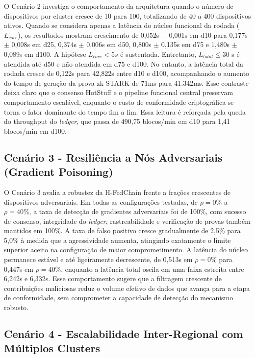 \documentclass[12pt]{article}
\begin{document}
O Cenário 2 investiga o comportamento da arquitetura quando o número de dispositivos por cluster cresce de 10 para 100, totalizando de 40 a 400 dispositivos ativos. Quando se considera apenas a latência do núcleo funcional da rodada ($L_{core}$), os resultados mostram crescimento de 0,052s $\pm$ 0,001s em d10 para 0,177s $\pm$ 0,008s em d25, 0,374s $\pm$ 0,006s em d50, 0,800s $\pm$ 0,135s em d75 e 1,480s $\pm$ 0,089s em d100. A hipótese $L_{core} < 5s$ é sustentada. Entretanto, $L_{total} ≤ 30$ s é atendida até d50 e não atendida em d75 e d100. No entanto, a latência total da rodada cresce de 0,122s para 42,822s entre d10 e d100, acompanhando o aumento do tempo de geração da prova zk-STARK de 71ms para 41.342ms. Esse contraste deixa claro que o consenso HotStuff e o pipeline funcional central preservam comportamento escalável, enquanto o custo de conformidade criptográfica se torna o fator dominante do tempo fim a fim. Essa leitura é reforçada pela queda do throughput do \textit{ledger}, que passa de 490,75 blocos/min em d10 para 1,41 blocos/min em d100.

\subsection{Cenário 3 - Resiliência a Nós Adversariais (Gradient Poisoning)}

O Cenário 3 avalia a robustez da H-FedChain frente a frações crescentes de dispositivos adversariais. Em todas as configurações testadas, de $\rho=0\%$ a $\rho=40\%$, a taxa de detecção de gradientes adversariais foi de 100\%, com sucesso de consenso, integridade do \textit{ledger}, rastreabilidade e verificação de provas também mantidos em 100\%. A taxa de falso positivo cresce gradualmente de 2,5\% para 5,0\% à medida que a agressividade aumenta, atingindo exatamente o limite superior aceito na configuração de maior comprometimento. A latência do núcleo permanece estável e até ligeiramente decrescente, de 0,513s em $\rho=0\%$ para 0,447s em $\rho=40\%$, enquanto a latência total oscila em uma faixa estreita entre 6,242s e 6,332s. Esse comportamento sugere que a filtragem crescente de contribuições maliciosas reduz o volume efetivo de dados que avança para a etapa de conformidade, sem comprometer a capacidade de detecção do mecanismo robusto.

\subsection{Cenário 4 - Escalabilidade Inter-Regional com Múltiplos Clusters}
\end{document}

